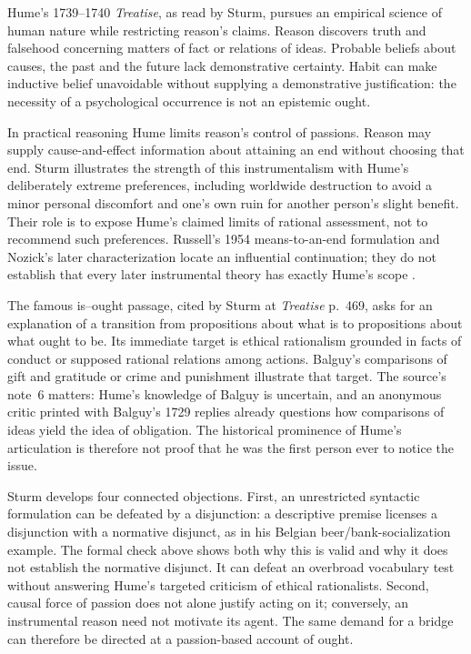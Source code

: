 Hume's 1739--1740 \emph{Treatise}, as read by Sturm, pursues an empirical
science of human nature while restricting reason's claims. Reason
discovers truth and falsehood concerning matters of fact or relations
of ideas. Probable beliefs about causes, the past and the future lack
demonstrative certainty. Habit can make inductive belief unavoidable
without supplying a demonstrative justification: the necessity of a
psychological occurrence is not an epistemic ought.

In practical reasoning Hume limits reason's control of passions.
Reason may supply cause-and-effect information about attaining an end
without choosing that end. Sturm illustrates the strength of this
instrumentalism with Hume's deliberately extreme preferences, including
worldwide destruction to avoid a minor personal discomfort and one's
own ruin for another person's slight benefit. Their role is to expose
Hume's claimed limits of rational assessment, not to recommend such
preferences. Russell's 1954 means-to-an-end formulation and Nozick's
later characterization locate an influential continuation; they do not
establish that every later instrumental theory has exactly Hume's scope
\parencite[pp.~75--77]{Sturm2021DescriptiveNormativeHistory}.

The famous is--ought passage, cited by Sturm at \emph{Treatise} p.~469,
asks for an explanation of a transition from propositions about what
is to propositions about what ought to be. Its immediate target is
ethical rationalism grounded in facts of conduct or supposed rational
relations among actions. Balguy's comparisons of gift and gratitude or
crime and punishment illustrate that target. The source's note~6
matters: Hume's knowledge of Balguy is uncertain, and an anonymous
critic printed with Balguy's 1729 replies already questions how comparisons
of ideas yield the idea of obligation. The historical prominence of
Hume's articulation is therefore not proof that he was the first person
ever to notice the issue.

Sturm develops four connected objections. First, an unrestricted
syntactic formulation can be defeated by a disjunction: a descriptive
premise licenses a disjunction with a normative disjunct, as in his
Belgian beer/bank-socialization example. The formal check above shows
both why this is valid and why it does not establish the normative
disjunct. It can defeat an overbroad vocabulary test without answering
Hume's targeted criticism of ethical rationalists. Second, causal force
of passion does not alone justify acting on it; conversely, an
instrumental reason need not motivate its agent. The same demand for
a bridge can therefore be directed at a passion-based account of ought.

